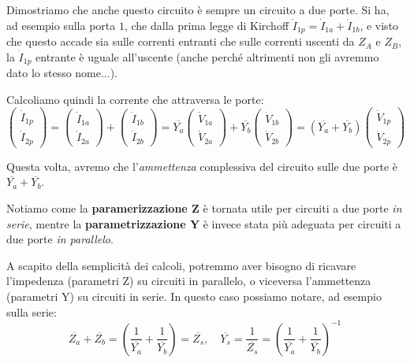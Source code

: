 \documentclass[a4paper,11pt]{article}
\begin{document}
Dimostriamo che anche questo circuito è sempre un circuito a due porte.
Si ha, ad esempio sulla porta $1$, che dalla prima legge di Kirchoff $\dot{I}_{1p} = \dot{I}_{1a} + \dot{I}_{1b}$, e visto che questo accade sia sulle correnti entranti che sulle correnti uscenti da $Z_A$ e $Z_B$, la $\dot{I}_{1p}$ entrante è uguale all'uscente (anche perché altrimenti non gli avremmo dato lo stesso nome...).

Calcoliamo quindi la corrente che attraversa le porte:
$$
\begin{pmatrix}
	\dot{I}_{1p} \\ \dot{I}_{2p} 
\end{pmatrix}
=
\begin{pmatrix}
	\dot{I}_{1a} \\ \dot{I}_{2a}
\end{pmatrix}
+
\begin{pmatrix}
	\dot{I}_{1b} \\ \dot{I}_{2b}
\end{pmatrix}
=
\overline{Y_a} 
\begin{pmatrix}
	\dot{V}_{1a} \\ \dot{V}_{2a}
\end{pmatrix}
+
\overline{Y_b}
\begin{pmatrix}
	\dot{V}_{1b} \\ \dot{V}_{2b}
\end{pmatrix}
=
(\overline{Y_a} + \overline{Y_b})
\begin{pmatrix}
	\dot{V}_{1p} \\ \dot{V}_{2p}
\end{pmatrix}
$$

Questa volta, avremo che l'\textit{ammettenza} complessiva del circuito sulle due porte è $\overline{Y_a} + \overline{Y_b}$.

\par\medskip

Notiamo come la \textbf{paramerizzazione Z} è tornata utile per circuiti a due porte \textit{in serie}, mentre la \textbf{parametrizzazione Y} è invece stata più adeguata per circuiti a due porte \textit{in parallelo}.

A scapito della semplicità dei calcoli, potremmo aver bisogno di ricavare l'impedenza (parametri Z) su circuiti in parallelo, o viceversa l'ammettenza (parametri Y) su circuiti in serie.
In questo caso possiamo notare, ad esempio sulla serie:
$$
\overline{Z_a} + \overline{Z_b} = \left( \frac{1}{\overline{Y_a}} + \frac{1}{\overline{Y_b}} \right) = \overline{Z_s}, \quad \overline{Y_s} = \frac{1}{\overline{Z_s}} = \left( \frac{1}{\overline{Y_a}} + \frac{1}{\overline{Y_b}} \right)^{-1} 
$$
\end{document}
